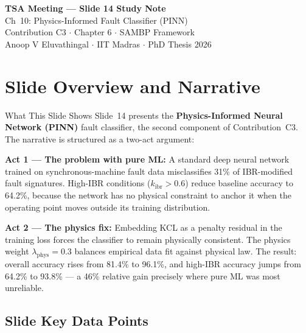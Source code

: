 \documentclass[12pt,a4paper]{article}
\newcommand{\kibr}{k_\mathrm{ibr}}
\begin{document}
\begin{tcolorbox}[colback=iitmnavy,coltext=white,arc=4pt,boxrule=0pt]
\begin{center}
  {\Large\bfseries TSA Meeting — Slide 14 Study Note}\\[4pt]
  {\large Ch~10: Physics-Informed Fault Classifier (PINN)}\\[6pt]
  {\normalsize Contribution C3 $\cdot$ Chapter 6 $\cdot$ SAMBP Framework}\\[2pt]
  {\small Anoop V Eluvathingal $\cdot$ IIT Madras $\cdot$ PhD Thesis 2026}
\end{center}
\end{tcolorbox}

\vspace{6pt}

\section{Slide Overview and Narrative}

\begin{keybox}{What This Slide Shows}
Slide~14 presents the \textbf{Physics-Informed Neural Network (PINN)} fault classifier, the second component of Contribution~C3. The narrative is structured as a two-act argument:

\textbf{Act 1 — The problem with pure ML:} A standard deep neural network trained on synchronous-machine fault data misclassifies 31\% of IBR-modified fault signatures. High-IBR conditions ($\kibr > 0.6$) reduce baseline accuracy to 64.2\%, because the network has no physical constraint to anchor it when the operating point moves outside its training distribution.

\textbf{Act 2 — The physics fix:} Embedding KCL as a penalty residual in the training loss forces the classifier to remain physically consistent. The physics weight $\lambda_\mathrm{phys} = 0.3$ balances empirical data fit against physical law. The result: overall accuracy rises from 81.4\% to 96.1\%, and high-IBR accuracy jumps from 64.2\% to 93.8\% — a 46\% relative gain precisely where pure ML was most unreliable.
\end{keybox}

\subsection{Slide Key Data Points}
\end{document}
